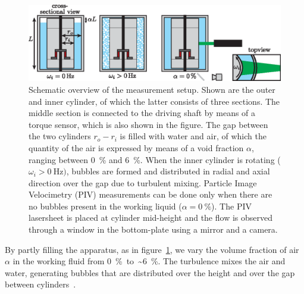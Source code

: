 \begin{figure}
    \centering
   \includegraphics{Figures/fig1}
    \caption{Schematic overview of the measurement setup. Shown are the outer and inner cylinder, of which the latter consists of three sections. The middle section is connected to the driving shaft by means of a torque sensor, which is also shown in the figure. The gap between the two cylinders $r_o - r_i$ is filled with water and air, of which the quantity of the air is expressed by means of a void fraction $\alpha$, ranging between \SI{0}{\percent} and \SI{6}{\percent}. When the inner cylinder is rotating ($\omega_i > \SI{0}{\hertz})$, bubbles are formed and distributed in radial and axial direction over the gap due to turbulent mixing. Particle Image Velocimetry (PIV) measurements can be done only when there are no bubbles present in the working liquid ($\alpha = \SI{0}{\percent}$). The PIV lasersheet is placed at cylinder mid-height and the flow is observed through a window in the bottom-plate using a mirror and a camera.}\label{fig:T3C}
\end{figure}

By partly filling the apparatus, as in figure~\ref{fig:T3C}, we vary the volume fraction of air $\alpha$ in the working fluid from \SI{0}{\percent}~to~\SI{~6}{\percent}. The turbulence mixes the air and water, generating bubbles that are distributed over the height and over the gap between cylinders~\citep{vanGils2013}.

